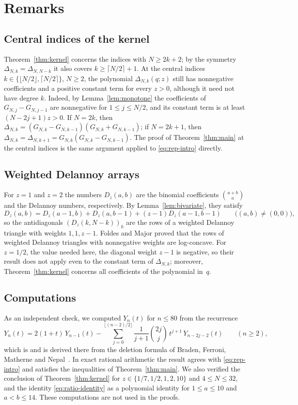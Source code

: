 \documentclass{amsart}
\theoremstyle{definition}
\theoremstyle{remark}
\numberwithin{equation}{section}
\numberwithin{table}{section}
\newcommand{\Dz}{D_z}
\begin{document}
\section{Remarks}\label{sec:remarks}

\subsection{Central indices of the kernel}
Theorem~\ref{thm:kernel} concerns the indices with $N\ge 2k+2$; by the symmetry $\Delta_{N,k}=\Delta_{N,N-k}$ it also covers $k\ge \lceil N/2\rceil+1$. At the central indices $k\in\{\lfloor N/2\rfloor,\lceil N/2\rceil\}$, $N\ge 2$, the polynomial $\Delta_{N,k}(q;z)$ still has nonnegative coefficients and a positive constant term for every $z>0$, although it need not have degree $k$. Indeed, by Lemma~\ref{lem:monotone} the coefficients of $G_{N,j}-G_{N,j-1}$ are nonnegative for $1\le j\le N/2$, and its constant term is at least $(N-2j+1)z>0$. If $N=2k$, then $\Delta_{N,k}=(G_{N,k}-G_{N,k-1})(G_{N,k}+G_{N,k-1})$; if $N=2k+1$, then $\Delta_{N,k}=\Delta_{N,k+1}=G_{N,k}(G_{N,k}-G_{N,k-1})$. The proof of Theorem~\ref{thm:main} at the central indices is the same argument applied to \eqref{eq:rep-intro} directly.

\subsection{Weighted Delannoy arrays}
For $z=1$ and $z=2$ the numbers $\Dz(a,b)$ are the binomial coefficients $\binom{a+b}{a}$ and the Delannoy numbers, respectively. By Lemma~\ref{lem:bivariate}, they satisfy
\[
\Dz(a,b)=\Dz(a-1,b)+\Dz(a,b-1)+(z-1)\Dz(a-1,b-1)\qquad\bigl((a,b)\neq(0,0)\bigr),
\]
so the antidiagonals $(\Dz(k,N-k))_k$ are the rows of a weighted Delannoy triangle with weights $1,1,z-1$. Foldes and Major \cite[Section~3, Corollary]{FM} proved that the rows of weighted Delannoy triangles with nonnegative weights are log-concave. For $z=1/2$, the value needed here, the diagonal weight $z-1$ is negative, so their result does not apply even to the constant term of $\Delta_{N,k}$; moreover, Theorem~\ref{thm:kernel} concerns all coefficients of the polynomial in~$q$.

\subsection{Computations}
As an independent check, we computed $Y_n(t)$ for $n\le 80$ from the recurrence
\[
Y_n(t)=2(1+t)\,Y_{n-1}(t)-\sum_{j=0}^{\lfloor(n-2)/2\rfloor}\frac{1}{j+1}\binom{2j}{j}\,t^{j+1}\,Y_{n-2j-2}(t)\qquad(n\ge 2),
\]
which is \cite[(68)]{GLL} and is derived there from the deletion formula of Braden, Ferroni, Matherne and Nepal~\cite{BFMN}. In exact rational arithmetic the result agrees with \eqref{eq:rep-intro} and satisfies the inequalities of Theorem~\ref{thm:main}. We also verified the conclusion of Theorem~\ref{thm:kernel} for $z\in\{1/7,1/2,1,2,10\}$ and $4\le N\le 32$, and the identity \eqref{eq:ratio-identity} as a polynomial identity for $1\le a\le 10$ and $a<b\le 14$. These computations are not used in the proofs.
\end{document}
